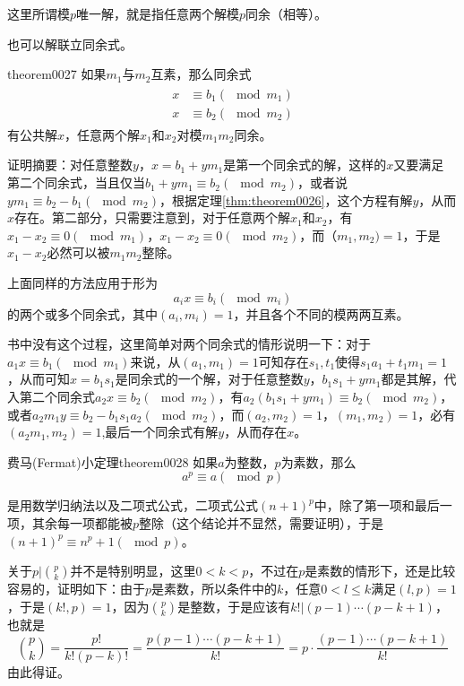 这里所谓模$p$唯一解，就是指任意两个解模$p$同余（相等）。

也可以解联立同余式。
\begin{theorem}{}{theorem0027}
如果$m_1$与$m_2$互素，那么同余式
\begin{gather}
\begin{aligned}
x &\equiv b_1 (\mod{m_1}) \\
x &\equiv b_2 (\mod{m_2})
\end{aligned}
\end{gather}
有公共解$x$，任意两个解$x_1$和$x_2$对模$m_1m_2$同余。
\end{theorem}

证明摘要：对任意整数$y$，$x = b_1 + ym_1$是第一个同余式的解，这样的$x$又要满足 第二个同余式，当且仅当$b_1+ym_1 \equiv b_2(\mod{m_2})$，或者说$ym_1 \equiv b_2-b_1 (\mod{m_2})$，根据定理\ref{thm:theorem0026}，这个方程有解$y$，从而$x$存在。第二部分，只需要注意到，对于任意两个解$x_1$和$x_2$，有$x_1-x_2 \equiv 0(\mod{m_1})$，$x_1-x_2 \equiv 0 (\mod{m_2})$，而$（m_1, m_2) = 1$，于是$x_1-x_2$必然可以被$m_1m_2$整除。

上面同样的方法应用于形为
\[
a_ix \equiv b_i (\mod{m_i})
\]
的两个或多个同余式，其中$(a_i, m_i)=1$，并且各个不同的模两两互素。

书中没有这个过程，这里简单对两个同余式的情形说明一下：对于$a_1x \equiv b_1(\mod{m_1})$来说，从$(a_1, m_1)=1$可知存在$s_1,t_1$使得$s_1a_1+t_1m_1=1$，从而可知$x = b_1s_1$是同余式的一个解，对于任意整数$y$，$b_1s_1+ym_1$都是其解，代入第二个同余式$a_2x \equiv b_2(\mod{m_2})$，有$a_2(b_1s_1 + ym_1) \equiv b_2(\mod{m_2})$，或者$a_2m_1y \equiv b_2 - b_1s_1a_2 (\mod{m_2})$，而$(a_2, m_2)=1$，$(m_1, m_2)=1$，必有$(a_2m_1, m_2)=1$,最后一个同余式有解$y$，从而存在$x$。

\begin{theorem}{费马(Fermat)小定理}{theorem0028}
如果$a$为整数，$p$为素数，那么
\[
a^p \equiv a(\mod{p})
\]
\end{theorem}

是用数学归纳法以及二项式公式，二项式公式$(n+1)^p$中，除了第一项和最后一项，其余每一项都能被$p$整除（这个结论并不显然，需要证明），于是$(n+1)^p \equiv n^p + 1(\mod{p})$。

关于$p | {p \choose k}$并不是特别明显，这里$0 < k < p$，不过在$p$是素数的情形下，还是比较容易的，证明如下：由于$p$是素数，所以条件中的$k$，任意$0 < l \le k$满足$(l, p)=1$，于是$(k!, p)=1$，因为$p \choose k$是整数，于是应该有$k!|(p-1)\cdots(p-k+1)$，也就是
\[
\binom{p}{k} = \frac{p!}{k!(p-k)!} = \frac{p(p-1)\cdots(p-k+1)}{k!} = p \cdot \frac{(p-1)\cdots(p-k+1)}{k!}
\]
由此得证。

